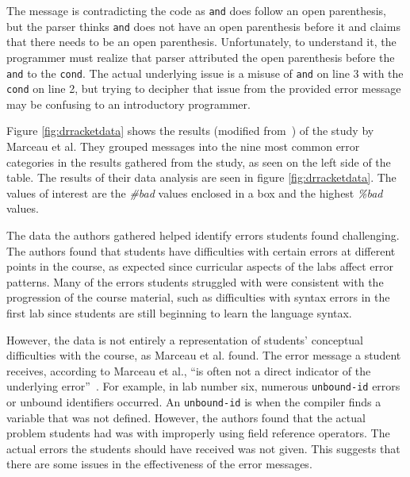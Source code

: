 \documentclass{sig-alternate}
\begin{document}
The message is contradicting the code as \texttt{and} does follow an open parenthesis, but the parser thinks \texttt{and} does not have an open parenthesis before it and claims that there needs to be an open parenthesis.
Unfortunately, to understand it, the programmer must realize that parser attributed the open parenthesis before the \texttt{and} to the \texttt{cond}.
The actual underlying issue is a misuse of \texttt{and} on line 3 with the \texttt{cond} on line 2, but trying to decipher that issue from the provided error message may be confusing to an introductory programmer.



Figure \ref{fig:drracketdata} shows the results (modified from~\cite{Marceau:2011:MEE:1953163.1953308}) of the study by Marceau et al. 
They grouped messages into the nine most common error categories in the results gathered from the study, as seen on the left side of the table.
The results of their data analysis are seen in figure \ref{fig:drracketdata}.
The values of interest are the \textit{\#bad} values enclosed in a box and the highest \textit{\%bad} values. 

The data the authors gathered helped identify errors students found challenging.
The authors found that students have difficulties with certain errors at different points in the course, as expected since curricular aspects of the labs affect error patterns.
Many of the errors students struggled with were consistent with the progression of the course material, such as difficulties with syntax errors in the first lab since students are still beginning to learn the language syntax.

However, the data is not entirely a representation of students' conceptual difficulties with the course, as Marceau et al. found.
The error message a student receives, according to Marceau et al., ``is often not a direct indicator of the underlying error''~\cite{Marceau:2011:MEE:1953163.1953308}.
For example, in lab number six, numerous \texttt{unbound-id} errors or unbound identifiers occurred.
An \texttt{unbound-id} is when the compiler finds a variable that was not defined.
However, the authors found that the actual problem students had was with improperly using field reference operators.
The actual errors the students should have received was not given.
This suggests that there are some issues in the effectiveness of the error messages.
\end{document}
